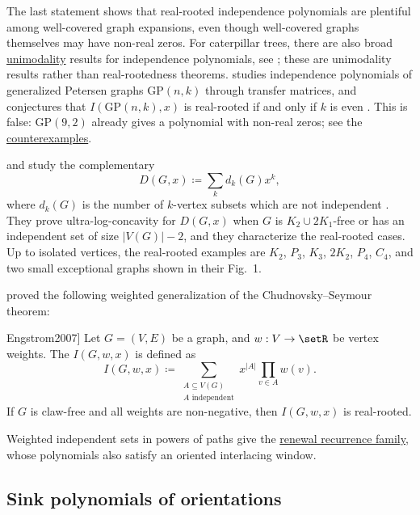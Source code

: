 The last statement shows that real-rooted independence polynomials are
plentiful among well-covered graph expansions, even though well-covered graphs
themselves may have non-real zeros. For caterpillar trees, there are also
broad \hyperref[unimodalPolynomial]{unimodality} results for independence
polynomials, see
\cite{BahlsEthridgeSzabo2018}; these are unimodality results rather than
real-rootedness theorems.
 studies independence polynomials of generalized Petersen
graphs $\mathrm{GP}(n,k)$ through transfer matrices, and conjectures that $I(\mathrm{GP}(n,k),x)$ is real-rooted if and only if
$k$ is even \cite{Pandey2026x}.  This is false:
$\mathrm{GP}(9,2)$ already gives a polynomial with non-real zeros; see the
\hyperref[conjPetersenIndependence]{counterexamples}.

 and  study the complementary
\label{dependencePolynomial}
\[
  D(G,x) \coloneqq \sum_k d_k(G)x^k,
\]
where $d_k(G)$ is the number of $k$-vertex subsets which are not independent
\cite{XieXu2024x}.  They prove ultra-log-concavity for $D(G,x)$ when $G$ is
$K_2\cup 2K_1$-free or has an independent set of size $|V(G)|-2$, and they
characterize the real-rooted cases.  Up to isolated vertices, the
real-rooted examples are $K_2$, $P_3$, $K_3$, $2K_2$, $P_4$, $C_4$, and two
small exceptional graphs shown in their Fig.~1.

 proved the following weighted generalization of the Chudnovsky--Seymour theorem:
\begin{theorem*}[A. Engström, \cite[Thm.~2.5]{Engstrom2007}]
Let $G = (V,E)$ be a graph, and $w : V \to \setR$ be vertex weights.
The \label{weightedIndependencePolynomial}
$I(G,w,x)$ is defined as
\[
I(G,w,x) \coloneqq \sum_{\substack{A \subseteq V(G) \\ \text{$A$ independent}}} x^{|A|} \prod_{v\in A} w(v).
\]
If $G$ is claw-free and all weights are non-negative, then $I(G,w,x)$ is real-rooted.
\end{theorem*}

Weighted independent sets in powers of paths give the
\hyperref[interlacingRenewalRecurrences]{renewal recurrence family},
whose polynomials also satisfy an oriented interlacing window.


\subsection[realRootedSinkPolynomials]{Sink polynomials of orientations}

